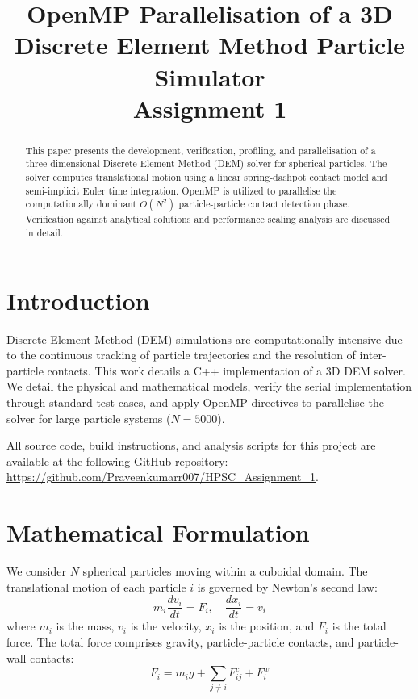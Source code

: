 \documentclass[conference]{IEEEtran}
\begin{document}
\title{OpenMP Parallelisation of a 3D Discrete Element Method Particle Simulator\\
\large Assignment 1}

\author{
}

\maketitle

\begin{abstract}
This paper presents the development, verification, profiling, and parallelisation of a three-dimensional Discrete Element Method (DEM) solver for spherical particles. The solver computes translational motion using a linear spring-dashpot contact model and semi-implicit Euler time integration. OpenMP is utilized to parallelise the computationally dominant $O(N^2)$ particle-particle contact detection phase. Verification against analytical solutions and performance scaling analysis are discussed in detail.
\end{abstract}

\section{Introduction}
Discrete Element Method (DEM) simulations are computationally intensive due to the continuous tracking of particle trajectories and the resolution of inter-particle contacts. This work details a C++ implementation of a 3D DEM solver. We detail the physical and mathematical models, verify the serial implementation through standard test cases, and apply OpenMP directives to parallelise the solver for large particle systems ($N=5000$).

All source code, build instructions, and analysis scripts for this project are available at the following GitHub repository: \url{https://github.com/Praveenkumarr007/HPSC_Assignment_1}.

\section{Mathematical Formulation}
We consider $N$ spherical particles moving within a cuboidal domain. The translational motion of each particle $i$ is governed by Newton's second law:
\begin{equation}
m_{i}\frac{dv_{i}}{dt}=F_{i}, \quad \frac{dx_{i}}{dt}=v_{i}
\end{equation}
where $m_i$ is the mass, $v_i$ is the velocity, $x_i$ is the position, and $F_i$ is the total force. The total force comprises gravity, particle-particle contacts, and particle-wall contacts:
\begin{equation}
F_{i}=m_{i}g+\sum_{j\ne i}F_{ij}^{c}+F_{i}^{w}
\end{equation}
\end{document}
